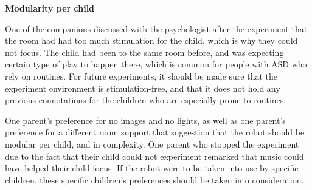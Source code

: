 \vspace{3mm}
\noindent\textbf{Modularity per child}

One of the companions discussed with the psychologist after the experiment that the room had had too much stimulation for the child, which is why they could not focus. The child had been to the same room before, and was expecting certain type of play to happen there, which is common for people with ASD who rely on routines. For future experiments, it should be made sure that the experiment environment is stimulation-free, and that it does not hold any previous connotations for the children who are especially prone to routines.

One parent's preference for no images and no lights, as well as one parent's preference for a different room support that suggestion that the robot should be modular per child, and in complexity. One parent who stopped the experiment due to the fact that their child could not experiment remarked that music could have helped their child focus. If the robot were to be taken into use by specific children, these specific children's preferences should be taken into consideration.
